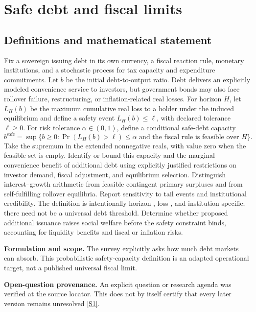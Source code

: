 \documentclass[11pt]{article}
\newcommand{\sref}[2]{\hyperlink{source:#1:#2}{[S#2]}}
\begin{document}
\section*{Safe debt and fiscal limits}\label{30007535}
\subsection{Definitions and mathematical statement}
Fix a sovereign issuing debt in its own currency, a fiscal reaction rule, monetary institutions, and a stochastic process for tax capacity and expenditure commitments. Let \(b\) be the initial debt-to-output ratio. Debt delivers an explicitly modeled convenience service to investors, but government bonds may also face rollover failure, restructuring, or inflation-related real losses. For horizon \(H\), let \(L_H(b)\) be the maximum cumulative real loss to a holder under the induced equilibrium and define a safety event \(L_H(b)\le\ell\), with declared tolerance \(\ell\ge0\).
For risk tolerance \(\alpha\in(0,1)\), define a conditional safe-debt capacity
\[
b^{\mathrm{safe}}=
\sup\{b\ge0:\Pr(L_H(b)>\ell)\le\alpha
\text{ and the fiscal rule is feasible over }H\}.
\]
Take the supremum in the extended nonnegative reals, with value zero when the feasible set is empty. Identify or bound this capacity and the marginal convenience benefit of additional debt using explicitly justified restrictions on investor demand, fiscal adjustment, and equilibrium selection. Distinguish interest–growth arithmetic from feasible contingent primary surpluses and from self-fulfilling rollover equilibria. Report sensitivity to tail events and institutional credibility. The definition is intentionally horizon-, loss-, and institution-specific; there need not be a universal debt threshold. Determine whether proposed additional issuance raises social welfare before the safety constraint binds, accounting for liquidity benefits and fiscal or inflation risks.

\par\textbf{Formulation and scope.} The survey explicitly asks how much debt markets can absorb. This probabilistic safety-capacity definition is an adapted operational target, not a published universal fiscal limit.

\par\textbf{Open-question provenance.} An explicit question or research agenda was verified at the source locator. This does not by itself certify that every later version remains unresolved \sref{30007535}{1}.
\end{document}
